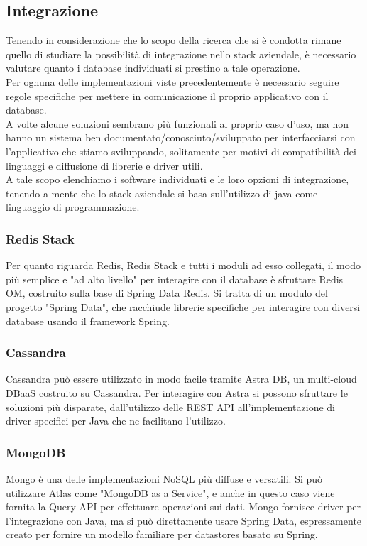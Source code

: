 \subsection{Integrazione}
Tenendo in considerazione che lo scopo della ricerca che si è condotta rimane quello di studiare la possibilità di integrazione nello stack aziendale, è necessario valutare quanto i database individuati si prestino a tale operazione.\\

\noindent Per ognuna delle implementazioni viste precedentemente è necessario seguire regole specifiche per mettere in comunicazione il proprio applicativo con il database.\\
A volte alcune soluzioni sembrano più funzionali al proprio caso d'uso, ma non hanno un sistema ben documentato/conosciuto/sviluppato per interfacciarsi con l'applicativo che stiamo sviluppando, solitamente per motivi di compatibilità dei linguaggi e diffusione di librerie e driver utili.\\
A tale scopo elenchiamo i software individuati e le loro opzioni di integrazione, tenendo a mente che lo stack aziendale si basa sull'utilizzo di java come linguaggio di programmazione.

\subsubsection{Redis Stack}
Per quanto riguarda Redis, Redis Stack e tutti i moduli ad esso collegati, il modo più semplice e "ad alto livello" per interagire con il database è sfruttare Redis OM, costruito sulla base di Spring Data Redis. Si tratta di un modulo del progetto "Spring Data", che racchiude librerie specifiche per interagire con diversi database usando il framework Spring.

\subsubsection{Cassandra}
Cassandra può essere utilizzato in modo facile tramite Astra DB, un multi-cloud DBaaS costruito su Cassandra.
Per interagire con Astra si possono sfruttare le soluzioni più disparate, dall'utilizzo delle REST API all'implementazione di driver specifici per Java che ne facilitano l'utilizzo.

\subsubsection{MongoDB}
Mongo è una delle implementazioni NoSQL più diffuse e versatili. Si può utilizzare Atlas come "MongoDB as a Service", e anche in questo caso viene fornita la Query API per effettuare operazioni sui dati. Mongo fornisce driver per l'integrazione con Java, ma si può direttamente usare Spring Data, espressamente creato per fornire un modello familiare per datastores basato su Spring.

